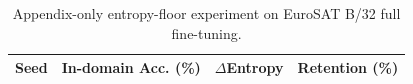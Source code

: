 \begin{table}[t]
\centering
\caption{Appendix-only entropy-floor experiment on EuroSAT B/32 full fine-tuning.}
\label{tab:appendix-regularization}
\small
\begin{tabular}{lrrr}
\toprule
Seed & In-domain Acc. (\%) & $\Delta$Entropy & Retention (\%) \\
\midrule

\bottomrule
\end{tabular}
\end{table}
